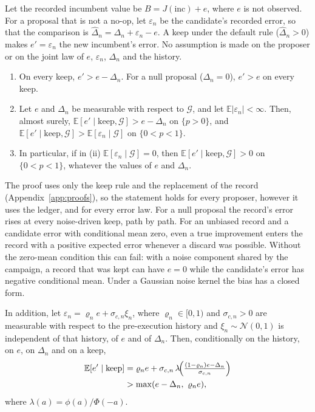 \begin{proposition}\label{prop:bias}
Let the recorded incumbent value be $B=J(\mathrm{inc})+e$, where $e$ is not observed. For a proposal that is not a no-op, let $\varepsilon_n$ be the candidate's recorded error, so that the comparison is $\hat\Delta_n=\Delta_n+\varepsilon_n-e$. A keep under the default rule ($\hat\Delta_n>0$) makes $e'=\varepsilon_n$ the new incumbent's error. No assumption is made on the proposer or on the joint law of $e$, $\varepsilon_n$, $\Delta_n$ and the history.
\begin{enumerate}
\item[(i)] On every keep, $e'>e-\Delta_n$. For a null proposal ($\Delta_n=0$), $e'>e$ on every keep.
\item[(ii)] Let $e$ and $\Delta_n$ be measurable with respect to $\mathcal{G}$, and let $\mathbb{E}|\varepsilon_n|<\infty$. Then, almost surely, $\mathbb{E}[e'\mid\mathrm{keep},\mathcal{G}]>e-\Delta_n$ on $\{p>0\}$, and $\mathbb{E}[e'\mid\mathrm{keep},\mathcal{G}]>\mathbb{E}[\varepsilon_n\mid\mathcal{G}]$ on $\{0<p<1\}$.
\item[(iii)] In particular, if in (ii) $\mathbb{E}[\varepsilon_n\mid\mathcal{G}]=0$, then $\mathbb{E}[e'\mid\mathrm{keep},\mathcal{G}]>0$ on $\{0<p<1\}$, whatever the values of $e$ and $\Delta_n$.
\end{enumerate}
\end{proposition}

The proof uses only the keep rule and the replacement of the record (Appendix~\ref{app:proofs}), so the statement holds for every proposer, however it uses the ledger, and for every error law. For a null proposal the record's error rises at every noise-driven keep, path by path. For an unbiased record and a candidate error with conditional mean zero, even a true improvement enters the record with a positive expected error whenever a discard was possible. Without the zero-mean condition this can fail: with a noise component shared by the campaign, a record that was kept can have $e=0$ while the candidate's error has negative conditional mean. Under a Gaussian noise kernel the bias has a closed form.

\begin{corollary}\label{cor:bias-kernel}
In addition, let $\varepsilon_n=\varrho_n e+\sigma_{c,n}\xi_n$, where $\varrho_n\in[0,1)$ and $\sigma_{c,n}>0$ are measurable with respect to the pre-execution history and $\xi_n\sim\mathcal{N}(0,1)$ is independent of that history, of $e$ and of $\Delta_n$. Then, conditionally on the history, on $e$, on $\Delta_n$ and on a keep,
\begin{align*}
\mathbb{E}[e'\mid\mathrm{keep}]
&=\varrho_n e+\sigma_{c,n}\,\lambda\!\Bigl(\tfrac{(1-\varrho_n)e-\Delta_n}{\sigma_{c,n}}\Bigr)\\
&>\max(e-\Delta_n,\ \varrho_n e),
\end{align*}
where $\lambda(a)=\phi(a)/\Phi(-a)$.
\end{corollary}


